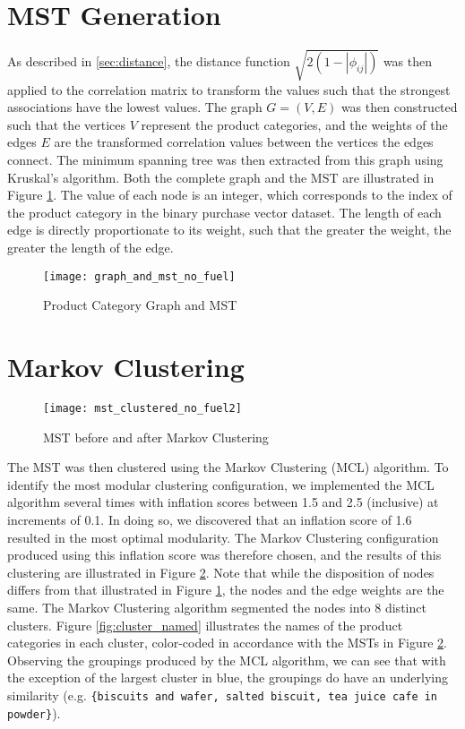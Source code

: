 \section{MST Generation}
As described in \ref{sec:distance}, the distance function $\sqrt{2(1-|\phi_{ij}|)}$ was then applied to the correlation matrix to transform the values such that the strongest associations have the lowest values. The graph $G=(V,E)$ was then constructed such that the vertices $V$ represent the product categories, and the weights of the edges $E$ are the transformed correlation values between the vertices the edges connect. The minimum spanning tree was then extracted from this graph using Kruskal's algorithm. Both the complete graph and the MST are illustrated in Figure \ref{fig:graph_mst}. The value of each node is an integer, which corresponds to the index of the product category in the binary purchase vector dataset. The length of each edge is directly proportionate to its weight, such that the greater the weight, the greater the length of the edge.
\begin{figure}[H]
\centering
\texttt{[image: graph\_and\_mst\_no\_fuel]}
\caption{Product Category Graph and MST}
\label{fig:graph_mst}
\end{figure}

\section{Markov Clustering}
\begin{figure}[H]
\centering
\texttt{[image: mst\_clustered\_no\_fuel2]}
\caption{MST before and after Markov Clustering}
\label{fig:clustered}
\end{figure}
The MST was then clustered using the Markov Clustering (MCL) algorithm. To identify the most modular clustering configuration, we implemented the MCL algorithm several times with inflation scores between 1.5 and 2.5 (inclusive) at increments of 0.1. In doing so, we discovered that an inflation score of 1.6 resulted in the most optimal modularity. The Markov Clustering configuration produced using this inflation score was therefore chosen, and the results of this clustering are illustrated in Figure \ref{fig:clustered}. Note that while the disposition of nodes differs from that illustrated in Figure \ref{fig:graph_mst}, the nodes and the edge weights are the same.
The Markov Clustering algorithm segmented the nodes into 8 distinct clusters.
Figure \ref{fig:cluster_named} illustrates the names of the product categories in each cluster, color-coded in accordance with the MSTs in Figure \ref{fig:clustered}. Observing the groupings produced by the MCL algorithm, we can see that with the exception of the largest cluster in blue, the groupings do have an underlying similarity (e.g. \texttt{\{biscuits and wafer, salted biscuit, tea juice cafe in powder\}}).

